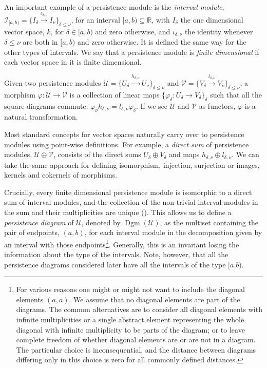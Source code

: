 \documentclass[8pt,a4paper,oneside,english,english]{article}
\theoremstyle{plain}
\theoremstyle
{plain}
\theoremstyle{definition}
\newcommand{\R}{\mathbb{R}}
\newcommand{\intmod}[1]{\mathcal{I}_{#1}}
\DeclareMathOperator{\Dgm}{Dgm}
\begin{document}
An important example of a persistence module is the \emph{interval module},
$\intmod{[a,b)}=\{I_\delta\xrightarrow{\iota_{\delta,\nu}}I_\nu\}_{\delta\leq\nu}$, for an interval $[a, b)\subseteq \R$,
with $I_\delta$ the one dimensional vector space, $k$, for $\delta\in[a,b)$ and zero otherwise, and $\iota_{\delta,\nu}$ the identity whenever $\delta\leq\nu$ are both in $[a,b)$ and zero otherwise. It is defined the same way for the other types of intervals. We say that a persistence module is \emph{finite dimensional} if each vector space in it is finite dimensional.

Given two persistence modules $\mathcal U=\{U_\delta\xrightarrow{h_{\delta,\nu}}U_\nu\}_{\delta\leq\nu}$ and $\mathcal V=\{V_\delta\xrightarrow{l_{\delta,\nu}}V_\nu\}_{\delta\leq\nu}$, a morphism $\varphi:\mathcal{U}\rightarrow \mathcal{V}$ is a collection of linear maps $\{\varphi_\delta:U_\delta\rightarrow V_\delta\}_{\delta}$ such that all the square diagrams commute: $\varphi_{\nu} h_{\delta,\nu}=l_{\delta,\nu}\varphi_{\delta}$. If we see $\mathcal{U}$ and $\mathcal{V}$ as functors, $\varphi$ is a natural transformation.

Most standard concepts for vector spaces naturally carry over to persistence modules using point-wise definitions. For example, a \emph{direct sum} of persistence modules, $\mathcal{U}\oplus\mathcal{V}$, consists of the direct sums $U_\delta\oplus V_\delta$ and maps $h_{\delta,\nu}\oplus l_{\delta,\nu}$. We can take the same approach for defining isomorphism, injection, surjection or images, kernels and cokernels of morphisms.

Crucially, every finite dimensional persistence module is isomorphic to a direct sum of interval modules, and the collection of the non-trivial interval modules in the sum and their multiplicities are unique (\cite{Gab, Cra-Boe}). This allows us to define a \emph{persistence diagram} of $\mathcal{U}$, denoted by $\Dgm(\mathcal{U})$, as the multiset containing the pair of endpoints, $(a, b)$, for each interval module in the decomposition given by an interval with those endpoints\footnote{
    For various reasons one might or might not want to include the diagonal elements $(a,a)$. We assume that no diagonal elements are part of the diagrams. The common alternatives are to consider all diagonal elements with infinite multiplicities or a single abstract element representing the whole diagonal with infinite multiplicity to be parts of the diagram; or to leave complete freedom of whether diagonal elements are or are not in a diagram. The particular choice is inconsequential, and the distance between diagrams differing only in this choice is zero for all commonly defined distances.
}. Generally, this is an invariant losing the information about the type of the intervals. Note, however, that all the persistence diagrams considered later have all the intervals of the type $[a. b)$.
\end{document}
